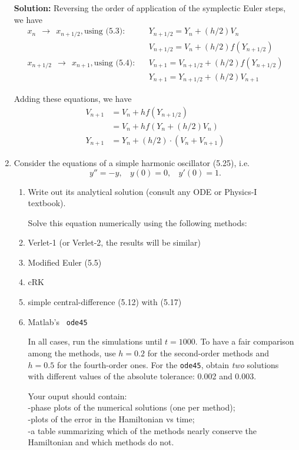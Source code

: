 \documentclass[11pt]{article}
\begin{document}
\begin{enumerate}
\bigskip
\textbf{Solution:} Reversing the order of application of the symplectic Euler steps, we have
\begin{align*} x_n ~~\to ~~ x_{n+1/2}, \text{using (5.3):} ~~~~ &Y_{n+1/2} = Y_{n} + (h/2) V_{n}\\
&V_{n+1/2} = V_n + (h/2) f(Y_{n+1/2})\\
x_{n+1/2} ~~\to ~~ x_{n+1}, \text{using (5.4):} ~~~~ &V_{n+1} = V_{n+1/2} + (h/2) f(Y_{n+1/2})\\
&Y_{n+1} = Y_{n+1/2} + (h/2) V_{n+1}\end{align*}

Adding these equations, we have
\begin{align*} V_{n+1} &= V_n + hf(Y_{n+1/2})\\
&= V_n + hf(Y_n + (h/2)V_n)\\
Y_{n+1} &= Y_n + (h/2) \cdot (V_{n} + V_{n+1})\end{align*}

\clearpage
\pagebreak
\item Consider the equations of a simple harmonic oscillator (5.25), i.e.
\[ y'' = -y, ~~~~ y(0)=0, ~~~~y'(0) = 1. \]
\begin{enumerate}
\item Write out its analytical solution (consult any ODE or Physics-I textbook).

Solve this equation numerically using the following methods:
\item Verlet-1 (or Verlet-2, the results will be similar)
\item Modified Euler (5.5)
\item cRK
\item simple central-difference (5.12) with (5.17)
\item Matlab's \verb| ode45 |

In all cases, run the simulations until $t = 1000$.
To have a fair comparison among the methods, use $h = 0.2$ for the second-order methods and $h = 0.5$ for the fourth-order ones.
For the \verb|ode45|, obtain {\em two} solutions with different values of the absolute tolerance: 0.002 and 0.003.

Your ouput should contain:\\
-phase plots of the numerical solutions (one per method);\\
-plots of the error in the Hamiltonian vs time;\\
-a table summarizing which of the methods nearly conserve the Hamiltonian and which methods do not.
\end{enumerate}


\end{enumerate}
\end{document}
